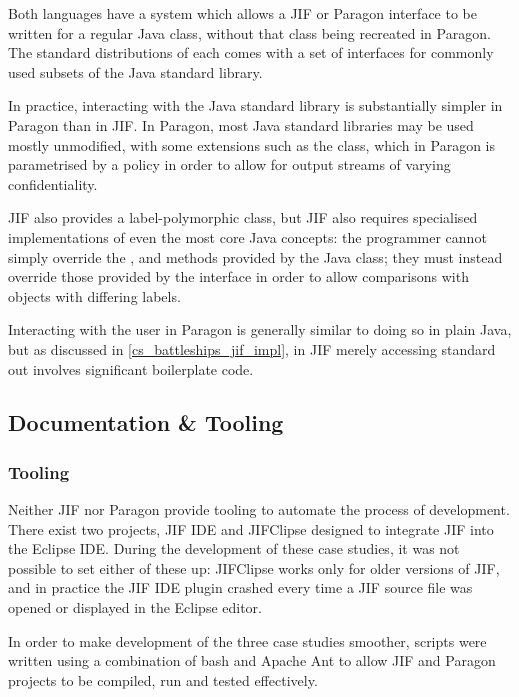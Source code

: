 Both languages have a system which allows a JIF or Paragon interface to be written for a regular Java class, without that class being recreated in Paragon. The standard distributions of each comes with a set of interfaces for commonly used subsets of the Java standard library.

In practice, interacting with the Java standard library is substantially simpler in Paragon than in JIF. In Paragon, most Java standard libraries may be used mostly unmodified, with some extensions such as the  class, which in Paragon is parametrised by a policy in order to allow for output streams of varying confidentiality. 

JIF also provides a label-polymorphic  class, but JIF also requires specialised implementations of even the most core Java concepts: the programmer cannot simply override the ,  and  methods provided by the Java  class; they must instead override those provided by the  interface in order to allow comparisons with objects with differing labels.

Interacting with the user in Paragon is generally similar to doing so in plain Java, but as discussed in \ref{cs_battleships_jif_impl}, in JIF merely accessing standard out involves significant boilerplate code.

\subsection{Documentation \& Tooling}

\subsubsection{Tooling}

Neither JIF nor Paragon provide tooling to automate the process of development. There exist two projects, JIF IDE \cite{jifwebsite} and JIFClipse \cite{hicks2007jifclipse} designed to integrate JIF into the Eclipse IDE. During the development of these case studies, it was not possible to set either of these up: JIFClipse works only for older versions of JIF, and in practice the JIF IDE plugin crashed every time a JIF source file was opened or displayed in the Eclipse editor.

In order to make development of the three case studies smoother, scripts were written using a combination of bash and Apache Ant to allow JIF and Paragon projects to be compiled, run and tested effectively.


